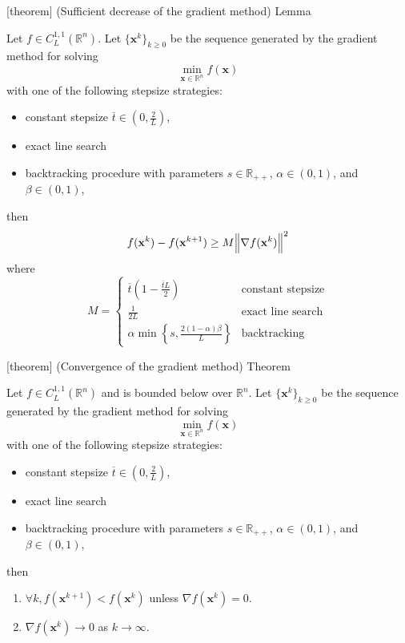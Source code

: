 \documentclass[12pt]{report}
\theoremstyle{definition}
\begin{document}
[theorem]
{(Sufficient decrease of the gradient method) Lemma}
\begin{sufficient decrease of gradient method}
    Let $f\in C_L^{1,1}(\mathbb{R}^{n})$.
    Let ${\{\mathbf{x}^k\}}_{k\ge 0}$ be the sequence generated by the gradient
    method for solving 
    \[
        \underset{\mathbf{x}\in\mathbb{R}^{n}}{\min}f(\mathbf{x})
    \]
    with one of the following stepsize strategies:
    \begin{itemize}
        \item constant stepsize $\overline{t}\in\left(0,\frac{2}{L}\right)$,
        \item exact line search
        \item backtracking procedure with parameters $s\in\mathbb{R}_{++}$,
            $\alpha\in(0,1)$, and $\beta\in(0,1)$,
    \end{itemize} 
    then
    \[
        f(\mathbf{x}^k)-f(\mathbf{x}^{k+1})\ge M\norm{\nabla f(\mathbf{x}^k)}^2
    \]
    where
    \[
        M=
        \begin{cases}
            \overline{t}\left(1-\frac{\overline{t}L}{2}\right) & \text{constant stepsize} \\
            \frac{1}{2L} & \text{exact line search} \\
            \alpha\min{\left\{s,\frac{2(1-\alpha)\beta}{L}\right\}} & \text{backtracking}
        \end{cases} 
    \]
\end{sufficient decrease of gradient method}

[theorem]
{(Convergence of the gradient method) Theorem}
\begin{convergence of the gradient method}
    Let $f\in C_L^{1,1}(\mathbb{R}^{n})$ and is bounded below over
    $\mathbb{R}^{n}$.
    Let ${\{\mathbf{x}^k\}}_{k\ge 0}$ be the sequence generated by the gradient
    method for solving 
    \[
        \underset{\mathbf{x}\in\mathbb{R}^{n}}{\min}f(\mathbf{x})
    \]
    with one of the following stepsize strategies:
    \begin{itemize}
        \item constant stepsize $\overline{t}\in\left(0,\frac{2}{L}\right)$,
        \item exact line search
        \item backtracking procedure with parameters $s\in\mathbb{R}_{++}$,
            $\alpha\in(0,1)$, and $\beta\in(0,1)$,
    \end{itemize} 
    then
    \begin{enumerate}
        \item $\forall k, f(\mathbf{x}^{k+1})<f(\mathbf{x}^k)$ unless $\nabla
            f(\mathbf{x}^k)=0$.
        \item $\nabla f(\mathbf{x}^k)\rightarrow 0$ as $k\rightarrow\infty$.
    \end{enumerate} 
\end{convergence of the gradient method}
\end{document}
